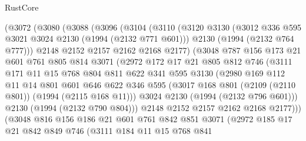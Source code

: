 \begin{lexlean}{RustCore}
\begin{coremodule}
        (@3072
          (@3080
            (@3088
              (@3096
                (@3104
                  (@3110
                    (@3120
                      @3130
                      (@3012 @336 @595 @3021 @3024 @2130 (@1994 (@2132 @771 @601)))
                      @2130
                      (@1994 (@2132 @764 @777)))
                    @2148
                    @2152
                    @2157
                    @2162
                    @2168
                    @2177)
                  (@3048
                    @787
                    @156
                    @173
                    @21
                    @601
                    @761
                    @805
                    @814
                    @3071
                    (@2972
                      @172
                      @17
                      @21
                      @805
                      @812
                      @746
                      (@3111
                        @171
                        @11
                        @15
                        @768
                        @804
                        @811
                        @622
                        @341
                        @595
                        @3130
                        (@2980
                          @169
                          @112
                          @11
                          @14
                          @801
                          @601
                          @646
                          @622
                          @346
                          @595
                          (@3017 @168 @801 (@2109 (@2110 @801)) (@1994 (@2115 @168 @11)))
                          @3024
                          @2130
                          (@1994 (@2132 @796 @601)))
                        @2130
                        (@1994 (@2132 @790 @804)))
                      @2148
                      @2152
                      @2157
                      @2162
                      @2168
                      @2177)))
                (@3048
                  @816
                  @156
                  @186
                  @21
                  @601
                  @761
                  @842
                  @851
                  @3071
                  (@2972
                    @185
                    @17
                    @21
                    @842
                    @849
                    @746
                    (@3111
                      @184
                      @11
                      @15
                      @768
                      @841

\end{coremodule}
\end{lexlean}
